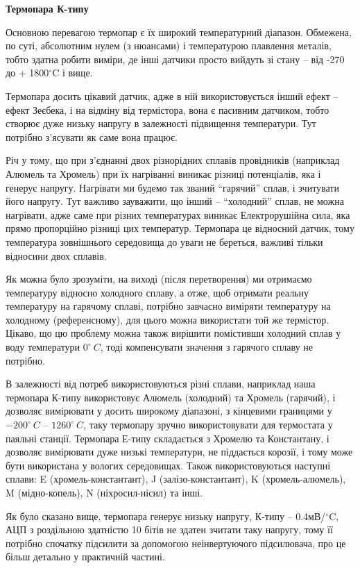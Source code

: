 \textbf{Термопара К-типу}\bigskip

Основною перевагою термопар є їх широкий температурний діапазон. Обмежена, по суті, абсолютним нулем (з нюансами) і температурою плавлення металів, тобто здатна робити виміри, де інші датчики просто вийдуть зі стану -- від -270 до + 1800$^\circ$C і вище.

Термопара досить цікавий датчик, адже в ній використовується інший ефект -- ефект Зеєбека, і на відміну від термістора, вона є пасивним датчиком, тобто створює дуже низьку напругу в залежності підвищення температури. Тут потрібно з'ясувати як саме вона працює.

Річ у тому, що при з'єднанні двох різнорідних сплавів провідників (наприклад Алюмель та Хромель) при їх нагріванні виникає різниці потенціалів, яка і генерує напругу. Нагрівати ми будемо так званий ``гарячий'' сплав, і зчитувати його напругу. Тут важливо зауважити, що інший -- ``холодний'' сплав, не можна нагрівати, адже саме при різних температурах виникає Електрорушійна сила, яка прямо пропорційно різниці цих температур. Термопара це відносний датчик, тому температура зовнішнього середовища до уваги не береться, важливі тільки відносини двох сплавів.

Як можна було зрозуміти, на виході (після перетворення) ми отримаємо температуру відносно холодного сплаву, а отже, щоб отримати реальну температуру на гарячому сплаві, потрібно завчасно виміряти температуру на холодному (референсному), для цього можна використати той же термістор. Цікаво, що цю проблему можна також вирішити помістивши холодний сплав у воду температури $0^\circ~C$, тоді компенсувати значення з гарячого сплаву не потрібно.

В залежності від потреб використовуються різні сплави, наприклад наша термопара К-типу використовує Алюмель (холодний) та Хромель (гарячий), і дозволяє вимірювати у досить широкому діапазоні, з кінцевими границями у $-200^\circ~C$ -- $1260^\circ~C$, таку термопару зручно використовувати для термостата у паяльні станції. Термопара Е-типу складається з Хромелю та Константану, і дозволяє вимірювати дуже низькі температури, не піддається корозії, і тому може бути використана у вологих середовищах. Також використовуються наступні сплави: E (хромель-константант), J (залізо-константант), K (хромель-алюмель), M (мідно-копель), N (ніхросил-нісил) та інші.

Як було сказано вище, термопара генерує низьку напругу, К-типу -- 0.4мВ/$^\circ$C, АЦП з роздільною здатністю 10 бітів не здатен зчитати таку напругу, тому її потрібно спочатку підсилити за допомогою неінвертуючого підсилювача, про це більш детально у практичній частині.


